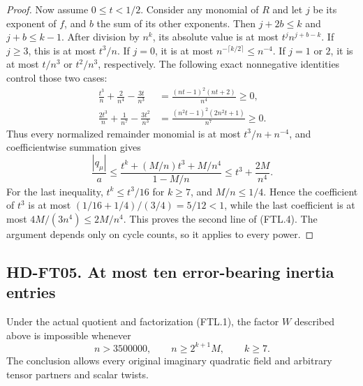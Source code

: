 \begin{proof}
Now assume $0\le t<1/2$.  Consider any monomial of $R$ and let $j$
be its exponent of $f$, and $b$ the sum of its other exponents.
Then $j+2b\le k$ and $j+b\le k-1$.
After division by $n^k$, its absolute value is at most
$t^j n^{j+b-k}$.  If $j\ge3$, this is at most $t^3/n$.
If $j=0$, it is at most $n^{-\lceil k/2\rceil}\le n^{-4}$.
If $j=1$ or $2$, it is at most $t/n^3$ or $t^2/n^3$, respectively.
The following exact nonnegative identities control those two cases:
\[
 \begin{split}
 \frac{t^3}{n}+\frac2{n^4}-\frac{3t}{n^3}
     &=\frac{(nt-1)^2(nt+2)}{n^4}\ge0,\\
 \frac{2t^3}{n}+\frac1{n^7}-\frac{3t^2}{n^3}
     &=\frac{(n^2t-1)^2(2n^2t+1)}{n^7}\ge0.
 \end{split}
 \tag{FTL.10}
\]
Thus every normalized remainder monomial is at most
$t^3/n+n^{-4}$, and coefficientwise summation gives
\[
 \frac{|q_\mu|}{a}
 \le\frac{t^k+(M/n)t^3+M/n^4}{1-M/n}
 \le t^3+\frac{2M}{n^4}.
 \tag{FTL.11}
\]
For the last inequality, $t^k\le t^3/16$ for $k\ge7$,
and $M/n\le1/4$.  Hence the coefficient of $t^3$ is at most
$(1/16+1/4)/(3/4)=5/12<1$, while the last coefficient is at most
$4M/(3n^4)\le2M/n^4$.  This proves the second line of (FTL.4).
The argument depends only on cycle counts, so it applies to every power.
\end{proof}

\subsection*{HD-FT05. At most ten error-bearing inertia entries}

\begin{theorem}[HD-FT05]
Under the actual quotient and factorization (FTL.1), the factor $W$
described above is impossible whenever
\[
                 n>3500000,\qquad n\ge2^{k+1}M,
                 \qquad k\ge7.
 \tag{FTL.12}
\]
The conclusion allows every original imaginary quadratic field and
arbitrary tensor partners and scalar twists.
\end{theorem}

